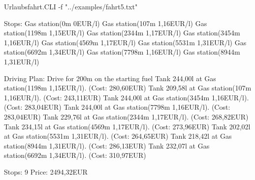 \documentclass[a4paper,10pt,ngerman]{scrartcl}
\begin{document}
\begin{lstcs}
Urlaubsfahrt.CLI -f "../examples/fahrt5.txt"

Stops:
  Gas station(0m 0EUR/l)
  Gas station(107m 1,16EUR/l)
  Gas station(1198m 1,15EUR/l)
  Gas station(2344m 1,17EUR/l)
  Gas station(3454m 1,16EUR/l)
  Gas station(4569m 1,17EUR/l)
  Gas station(5531m 1,31EUR/l)
  Gas station(6692m 1,34EUR/l)
  Gas station(7798m 1,16EUR/l)
  Gas station(8944m 1,31EUR/l)

Driving Plan:
  Drive for 200m on the starting fuel
  Tank 244,00l at Gas station(1198m 1,15EUR/l). (Cost: 280,60EUR)
  Tank 209,58l at Gas station(107m 1,16EUR/l). (Cost: 243,11EUR)
  Tank 244,00l at Gas station(3454m 1,16EUR/l). (Cost: 283,04EUR)
  Tank 244,00l at Gas station(7798m 1,16EUR/l). (Cost: 283,04EUR)
  Tank 229,76l at Gas station(2344m 1,17EUR/l). (Cost: 268,82EUR)
  Tank 234,15l at Gas station(4569m 1,17EUR/l). (Cost: 273,96EUR)
  Tank 202,02l at Gas station(5531m 1,31EUR/l). (Cost: 264,65EUR)
  Tank 218,42l at Gas station(8944m 1,31EUR/l). (Cost: 286,13EUR)
  Tank 232,07l at Gas station(6692m 1,34EUR/l). (Cost: 310,97EUR)

  Stops: 9
  Price: 2494,32EUR
\end{lstcs}
\end{document}
